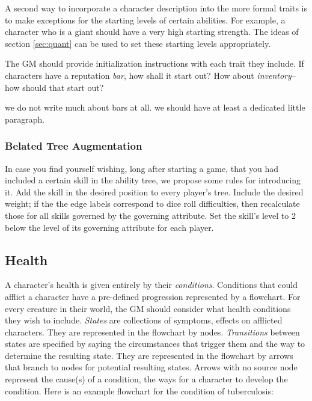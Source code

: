 \documentclass[12pt]{article}
\newcommand{\notes}[1]{{\color{Tan} #1}}
\newcommand{\emdex}[1]{\emph{#1}\index{#1}}
\begin{document}
A second way to incorporate a character description into the more formal traits
is to make exceptions for the starting levels of certain abilities.
For example, a character who is a giant should have a very high starting strength.
The ideas of section \ref{sec:quant} can be used to set these starting levels appropriately.

The GM should provide initialization instructions with each trait they include.
If characters have a reputation \emph{bar}, how shall it start out?
How about \emph{inventory}--how should that start out?

\notes{we do not write much about bars at all. we should have at least a dedicated little paragraph.}

\subsubsection{Belated Tree Augmentation}\label{sec:bta}

In case you find yourself wishing, long after starting a game,
that you had included a certain skill in the ability tree,
we propose some rules for introducing it.
Add the skill in the desired position to every player's tree.
Include the desired weight;
if the the edge labels correspond to dice roll difficulties, then recalculate those for all skills governed by the governing attribute.
Set the skill's level to 2 below the level of its governing attribute for each player.


\subsection{Health} \label{sec:health}
A character's health is given entirely by their \emdex{conditions}.
Conditions that could afflict a character have a pre-defined progression represented by a flowchart.
For every creature in their world, the GM should consider what health conditions they wish to include.
\emph{States} are collections of symptoms, effects on afflicted characters.
They are represented in the flowchart by nodes.
\emph{Transitions} between states are specified by saying the circumstances that trigger them
and the way to determine the resulting state.
They are represented in the flowchart by arrows that branch to nodes for potential resulting states.
Arrows with no source node represent the cause(s) of a condition, the ways for a character to develop the condition.
Here is an example flowchart for the condition of tuberculosis:
\end{document}
